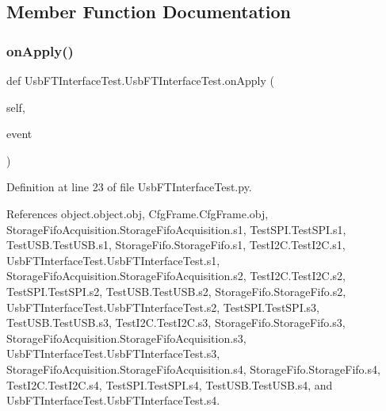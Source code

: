 \subsection{Member Function Documentation}
\mbox{\label{classUsbFTInterfaceTest_1_1UsbFTInterfaceTest_a8e9351da77d0c0de7215d7dfb77399ad}} 
\subsubsection{\texorpdfstring{on\+Apply()}{onApply()}}
{\footnotesize\ttfamily def Usb\+F\+T\+Interface\+Test.\+Usb\+F\+T\+Interface\+Test.\+on\+Apply (\begin{DoxyParamCaption}\item[{}]{self,  }\item[{}]{event }\end{DoxyParamCaption})}



Definition at line 23 of file Usb\+F\+T\+Interface\+Test.\+py.



References object.\+object.\+obj, Cfg\+Frame.\+Cfg\+Frame.\+obj, Storage\+Fifo\+Acquisition.\+Storage\+Fifo\+Acquisition.\+s1, Test\+S\+P\+I.\+Test\+S\+P\+I.\+s1, Test\+U\+S\+B.\+Test\+U\+S\+B.\+s1, Storage\+Fifo.\+Storage\+Fifo.\+s1, Test\+I2\+C.\+Test\+I2\+C.\+s1, Usb\+F\+T\+Interface\+Test.\+Usb\+F\+T\+Interface\+Test.\+s1, Storage\+Fifo\+Acquisition.\+Storage\+Fifo\+Acquisition.\+s2, Test\+I2\+C.\+Test\+I2\+C.\+s2, Test\+S\+P\+I.\+Test\+S\+P\+I.\+s2, Test\+U\+S\+B.\+Test\+U\+S\+B.\+s2, Storage\+Fifo.\+Storage\+Fifo.\+s2, Usb\+F\+T\+Interface\+Test.\+Usb\+F\+T\+Interface\+Test.\+s2, Test\+S\+P\+I.\+Test\+S\+P\+I.\+s3, Test\+U\+S\+B.\+Test\+U\+S\+B.\+s3, Test\+I2\+C.\+Test\+I2\+C.\+s3, Storage\+Fifo.\+Storage\+Fifo.\+s3, Storage\+Fifo\+Acquisition.\+Storage\+Fifo\+Acquisition.\+s3, Usb\+F\+T\+Interface\+Test.\+Usb\+F\+T\+Interface\+Test.\+s3, Storage\+Fifo\+Acquisition.\+Storage\+Fifo\+Acquisition.\+s4, Storage\+Fifo.\+Storage\+Fifo.\+s4, Test\+I2\+C.\+Test\+I2\+C.\+s4, Test\+S\+P\+I.\+Test\+S\+P\+I.\+s4, Test\+U\+S\+B.\+Test\+U\+S\+B.\+s4, and Usb\+F\+T\+Interface\+Test.\+Usb\+F\+T\+Interface\+Test.\+s4.



